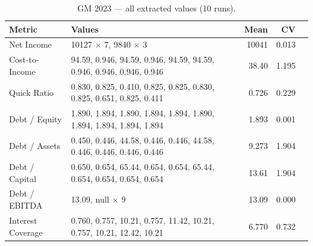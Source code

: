 \documentclass[12pt, a4paper]{article}
\newcommand{\cmark}{\textcolor{green!60!black}{\ding{51}}}  %
\newcommand{\xmark}{\textcolor{red!70!black}{\ding{55}}}    %
\begin{document}
\begin{table}[H]
\centering\small
\caption{GM 2023 --- all extracted values (10 runs).}
\label{tab:gm-raw}
\begin{tabular}{lp{8.5cm}rrc}
\toprule
\textbf{Metric} & \textbf{Values} & \textbf{Mean} & \textbf{CV} & \\
\midrule
Net Income        & 10127 $\times$ 7, 9840 $\times$ 3                                 & 10041 & 0.013 & \cmark \\
Cost-to-Income    & 94.59, 0.946, 94.59, 0.946, 94.59, 94.59, 0.946, 0.946, 0.946, 0.946 & 38.40 & 1.195 & \xmark \\
Quick Ratio       & 0.830, 0.825, 0.410, 0.825, 0.825, 0.830, 0.825, 0.651, 0.825, 0.411 & 0.726 & 0.229 & \xmark \\
Debt / Equity     & 1.890, 1.894, 1.890, 1.894, 1.894, 1.890, 1.894, 1.894, 1.894, 1.894 & 1.893 & 0.001 & \cmark \\
Debt / Assets     & 0.450, 0.446, 44.58, 0.446, 0.446, 44.58, 0.446, 0.446, 0.446, 0.446 & 9.273 & 1.904 & \xmark \\
Debt / Capital    & 0.650, 0.654, 65.44, 0.654, 0.654, 65.44, 0.654, 0.654, 0.654, 0.654 & 13.61 & 1.904 & \xmark \\
Debt / EBITDA     & 13.09, null $\times$ 9                                             & 13.09 & 0.000 & \xmark \\
Interest Coverage & 0.760, 0.757, 10.21, 0.757, 11.42, 10.21, 0.757, 10.21, 12.42, 10.21 & 6.770 & 0.732 & \xmark \\
\bottomrule
\end{tabular}
\end{table}
\end{document}
